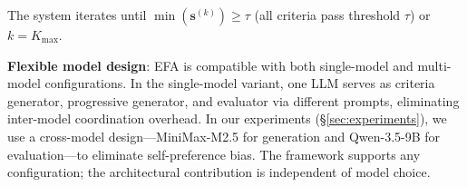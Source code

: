 \documentclass[11pt]{article}
\newcommand{\efa}{\textsc{EFA}}  %
\begin{document}
The system iterates until $\min(\mathbf{s}^{(k)}) \geq \tau$ (all criteria pass threshold $\tau$) or $k = K_{\max}$.

\textbf{Flexible model design}: \efa{} is compatible with both single-model and multi-model configurations. In the single-model variant, one LLM serves as criteria generator, progressive generator, and evaluator via different prompts, eliminating inter-model coordination overhead. In our experiments (\S\ref{sec:experiments}), we use a cross-model design---MiniMax-M2.5 for generation and Qwen-3.5-9B for evaluation---to eliminate self-preference bias. The framework supports any configuration; the architectural contribution is independent of model choice.

\end{document}
